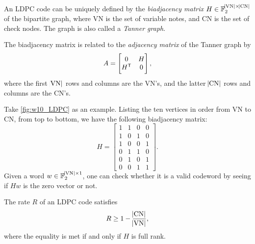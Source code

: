 \begin{definition}
    An LDPC code can be uniquely defined by the \textit{biadjacency matrix} $H\in\mathbb{F}_2^{\abs{\mathrm{VN}}\times\abs{\mathrm{CN}}}$ of the bipartite graph, where $\mathrm{VN}$ is the set of variable notes, and $\mathrm{CN}$ is the set of check nodes. The graph is also called a \textit{Tanner graph}.

    The biadjacency matrix is related to the \textit{adjacency matrix} of the Tanner graph by
    \begin{equation}
        A = \left[\begin{matrix}
            0 & H \\ H^{\mathsf{T}} & 0
        \end{matrix}\right],
    \end{equation}
    where the first $\abs{\mathrm{VN}}$ rows and columns are the VN's, and the latter $\abs{\mathrm{CN}}$ rows and columns are the CN's.
\end{definition}

\begin{example}
    Take \autoref{fig:w10_LDPC} as an example. Listing the ten vertices in order from VN to CN, from top to bottom, we have the following biadjacency matrix:
    \begin{equation*}
        H = \left[\begin{matrix}
            1 & 1 & 0 & 0 \\
            1 & 0 & 1 & 0 \\
            1 & 0 & 0 & 1 \\
            0 & 1 & 1 & 0 \\
            0 & 1 & 0 & 1 \\
            0 & 0 & 1 & 1 
        \end{matrix}\right].
    \end{equation*}
    Given a word $w\in\mathbb{F}_2^{\abs{\mathrm{VN}}\times 1}$, one can check whether it is a valid codeword by seeing if $Hw$ is the zero vector or not.
\end{example}

\begin{theorem}
    The rate $R$ of an LDPC code satisfies
    \begin{equation}
        R \ge 1- \frac{\abs{\mathrm{CN}}}{\abs{\mathrm{VN}}},
    \end{equation}
    where the equality is met if and only if $H$ is full rank.
\end{theorem}



